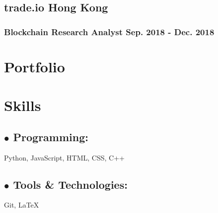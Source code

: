 \documentclass{article}
\begin{document}
\subsection{trade.io \hspace{5.85in} Hong Kong}
\subsubsection{Blockchain Research Analyst \hspace{4.3in} Sep. 2018 - Dec. 2018}


\section{Portfolio}


\section{Skills}

\subsection{$\bullet$ Programming:  }

Python, JavaScript, HTML, CSS, C++

\subsection{$\bullet$ Tools \& Technologies:}

Git, {\LaTeX}
\end{document}
